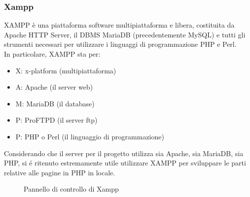 \documentclass[]{article}
\begin{document}
\subsubsection*{Xampp}
XAMPP è una piattaforma software multipiattaforma e libera, costituita da Apache HTTP Server, il DBMS MariaDB (precedentemente MySQL) e tutti gli strumenti necessari per utilizzare i linguaggi di programmazione PHP e Perl.\\
In particolare, XAMPP sta per:
\begin{itemize}
	\item X: x-platform (multipiattaforma)
	\item A: Apache (il server web)
	\item M: MariaDB (il database)
	\item P: ProFTPD (il server ftp)
	\item P: PHP o Perl (il linguaggio di programmazione)
\end{itemize}
Considerando che il server per il progetto utilizza sia Apache, sia MariaDB, sia PHP, si é ritenuto estremamente utile utilizzare XAMPP per sviluppare le parti relative alle pagine in PHP in locale.
\begin{figure}[H]
	\centering
	\caption{Pannello di controllo di Xampp}
\end{figure}
\newpage
\end{document}
